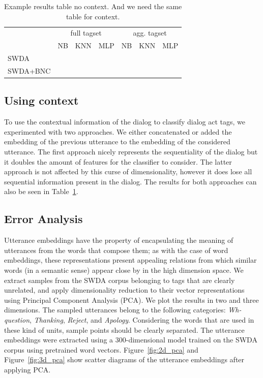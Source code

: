 \begin{table}[]
\centering
\small
\begin{tabular}{llll|lll}
                   & \multicolumn{3}{c|}{full tagset} & \multicolumn{3}{c}{agg. tagset} \\
                   & NB      & KNN     & MLP     & NB     & KNN     & MLP     \\
\hline
SWDA               &         &         &         &        &         &         \\
SWDA+BNC         &         &         &         &        &         &         \\
\end{tabular}
\caption{Example results table no context. And we need the same table for context.}
\label{tab:results}
\end{table}


\subsection{Using context}
To use the contextual information of the dialog to classify dialog act tags, we experimented with two  approaches. We either concatenated or added the embedding of the previous utterance to the embedding of the considered utterance.
The first approach nicely represents the sequentiality of the dialog but it doubles the amount of features for the classifier to consider.
The latter approach is not affected by this curse of dimensionality, however it does lose all sequential information present in the dialog.
The results for both approaches can also be seen in Table~\ref{tab:results}. 

\subsection{Error Analysis}
Utterance embeddings have the property of encapsulating the meaning of utterances from the words that compose them; as with the case of word embeddings, these representations present appealing relations from which similar words (in a semantic sense) appear close by in the high dimension space.
We extract samples from the SWDA corpus belonging to tags that are clearly unrelated, and apply dimensionality reduction to their vector representations using Principal Component Analysis (PCA).
We plot the results in two and three dimensions.
The sampled utterances belong to the following categories: \emph{Wh-question}, \emph{Thanking}, \emph{Reject}, and \emph{Apology}.
Considering the words that are used in these kind of units, sample points should be clearly separated.
The utterance embeddings were extracted using a 300-dimensional model trained on the SWDA corpus using pretrained word vectors.
Figure~\ref{fig:2d_pca} and Figure~\ref{fig:3d_pca} show scatter diagrams of the utterance embeddings after applying PCA.

